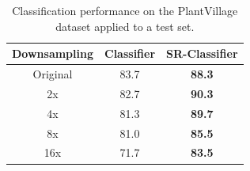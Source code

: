 \documentclass[10pt,twocolumn,letterpaper]{article}
\begin{document}

\begin{table}[h]
\caption{Classification performance on the PlantVillage dataset applied to a test set.}
\label{tab:results}
\centering
\begin{tabular}{|c|c|c|}
\hline
  Downsampling   & Classifier & SR-Classifier \\
\hline
\hline
Original & 83.7 & \textbf{88.3} \\
2x & 82.7 & \textbf{90.3} \\
4x & 81.3 & \textbf{89.7} \\
8x & 81.0 & \textbf{85.5} \\
16x & 71.7 & \textbf{83.5} \\
\hline
\end{tabular}
\end{table}
\end{document}
